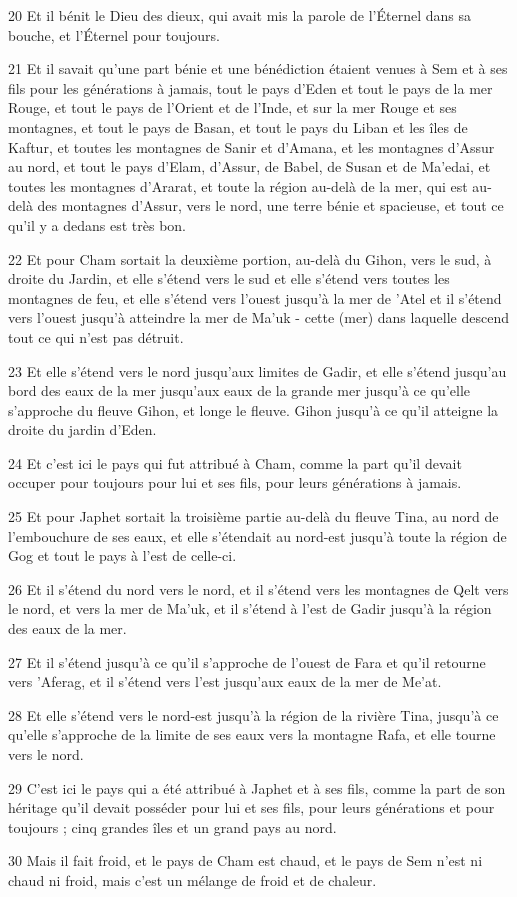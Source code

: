 \par 20 Et il bénit le Dieu des dieux, qui avait mis la parole de l'Éternel dans sa bouche, et l'Éternel pour toujours.
\par 21 Et il savait qu'une part bénie et une bénédiction étaient venues à Sem et à ses fils pour les générations à jamais, tout le pays d'Eden et tout le pays de la mer Rouge, et tout le pays de l'Orient et de l'Inde, et sur la mer Rouge et ses montagnes, et tout le pays de Basan, et tout le pays du Liban et les îles de Kaftur, et toutes les montagnes de Sanir et d'Amana, et les montagnes d'Assur au nord, et tout le pays d'Elam, d'Assur, de Babel, de Susan et de Ma'edai, et toutes les montagnes d'Ararat, et toute la région au-delà de la mer, qui est au-delà des montagnes d'Assur, vers le nord, une terre bénie et spacieuse, et tout ce qu'il y a dedans est très bon.
\par 22 Et pour Cham sortait la deuxième portion, au-delà du Gihon, vers le sud, à droite du Jardin, et elle s'étend vers le sud et elle s'étend vers toutes les montagnes de feu, et elle s'étend vers l'ouest jusqu'à la mer de 'Atel et il s'étend vers l'ouest jusqu'à atteindre la mer de Ma'uk - cette (mer) dans laquelle descend tout ce qui n'est pas détruit.
\par 23 Et elle s'étend vers le nord jusqu'aux limites de Gadir, et elle s'étend jusqu'au bord des eaux de la mer jusqu'aux eaux de la grande mer jusqu'à ce qu'elle s'approche du fleuve Gihon, et longe le fleuve. Gihon jusqu'à ce qu'il atteigne la droite du jardin d'Eden.
\par 24 Et c'est ici le pays qui fut attribué à Cham, comme la part qu'il devait occuper pour toujours pour lui et ses fils, pour leurs générations à jamais.
\par 25 Et pour Japhet sortait la troisième partie au-delà du fleuve Tina, au nord de l'embouchure de ses eaux, et elle s'étendait au nord-est jusqu'à toute la région de Gog et tout le pays à l'est de celle-ci.
\par 26 Et il s'étend du nord vers le nord, et il s'étend vers les montagnes de Qelt vers le nord, et vers la mer de Ma'uk, et il s'étend à l'est de Gadir jusqu'à la région des eaux de la mer.
\par 27 Et il s'étend jusqu'à ce qu'il s'approche de l'ouest de Fara et qu'il retourne vers 'Aferag, et il s'étend vers l'est jusqu'aux eaux de la mer de Me'at.
\par 28 Et elle s'étend vers le nord-est jusqu'à la région de la rivière Tina, jusqu'à ce qu'elle s'approche de la limite de ses eaux vers la montagne Rafa, et elle tourne vers le nord.
\par 29 C'est ici le pays qui a été attribué à Japhet et à ses fils, comme la part de son héritage qu'il devait posséder pour lui et ses fils, pour leurs générations et pour toujours ; cinq grandes îles et un grand pays au nord.
\par 30 Mais il fait froid, et le pays de Cham est chaud, et le pays de Sem n'est ni chaud ni froid, mais c'est un mélange de froid et de chaleur.

